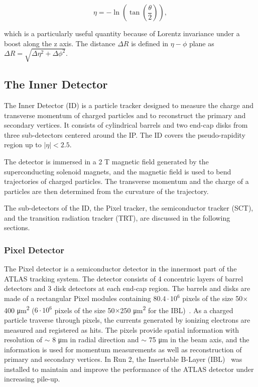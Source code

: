 \begin{equation}
    \label{eq:eta}
    \eta = -\ln (\tan (\frac{\theta}{2})),
\end{equation}

which is a particularly useful quantity because of Lorentz invariance under a boost along the z axis. The distance $\Delta R$ is defined in $\eta-\phi$ plane as $\Delta R = \sqrt{\Delta \eta^{2} + \Delta \phi^{2}}$.

\subsection{The Inner Detector}
\label{sec:atlas:id}
The Inner Detector (ID) is a particle tracker designed to measure the charge and transverse momentum of charged particles and to reconstruct the primary and secondary vertices. It consists of cylindrical barrels and two end-cap disks from three sub-detectors centered around the IP. The ID covers the pseudo-rapidity region up to $|\eta| < 2.5$. 

The detector is immersed  in a 2 T magnetic field generated by the superconducting solenoid magnets, and the magnetic field is used to bend trajectories of charged particles. The transverse momentum and the charge of a particles are then determined from the curvature of the trajectory.

The sub-detectors of the ID, the Pixel tracker, the semiconductor tracker (SCT), and the transition radiation tracker (TRT), are discussed in the following sections.

\subsubsection{Pixel Detector}
\label{sec:atlas:pixel}

The Pixel detector is a semiconductor detector in the innermost part of the ATLAS tracking system. The detector consists of 4 concentric layers of barrel detectors and 3 disk detectors at each end-cap region. The barrels and disks are made of a rectangular Pixel modules containing $80.4\cdot10^{6}$ pixels of the size 50$\times$400 \si{\micro\meter^{2}} ($6\cdot10^{6}$ pixels of the size 50$\times$250 \si{\micro\meter^{2}} for the IBL)~\cite{1748-0221-10-06-C06012}. As a charged particle traverse through pixels, the currents generated by ionizing electrons are measured and registered as hits. The pixels provide spatial information with resolution of $\sim$ 8 \si{\micro\meter} in radial direction and $\sim$ 75 \si{\micro\meter} in the beam axis, and the information is used for momentum measurements as well as reconstruction of primary and secondary vertices. In Run 2, the Insertable B-Layer (IBL)~\cite{Abbott:2307576} was installed to maintain and improve the performance of the ATLAS detector under increasing pile-up.

